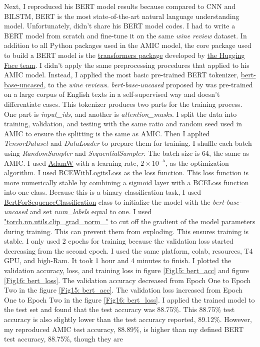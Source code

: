\documentclass[aoas]{imsart}
\numberwithin{equation}{section}
\theoremstyle{plain}
\theoremstyle{remark}
\begin{document}
Next, I reproduced his BERT model results because compared to CNN and BILSTM, BERT is the most state-of-the-art natural language understanding model. Unfortunately, \cite{chenyu} didn't share his BERT model codes. I had to write a BERT model from scratch and fine-tune it on the same \textit{wine review} dataset. In addition to all Python packages used in the AMIC model, the core package used to build a BERT model is the \href{https://huggingface.co/docs/transformers/index}{transformers package} developed by \href{https://huggingface.co/support}{the Hugging Face team}. I didn't apply the same preprocessing procedures that \cite{chenyu} applied to his AMIC model. Instead, I applied the most basic pre-trained BERT tokenizer, \href{https://huggingface.co/bert-base-uncased}{bert-base-uncased}, to the \textit{wine reviews}. \textit{bert-base-uncased} proposed by \cite{DBLP:journals/corr/abs-1810-04805} was pre-trained on a large corpus of English texts in a self-supervised way and doesn't differentiate cases. This tokenizer produces two parts for the training process. One part is \textit{input\_ids}, and another is \textit{attention\_masks}. I split the data into training, validation, and testing with the same ratio and random seed used in AMIC to ensure the splitting is the same as AMIC. Then I applied \textit{TensorDataset} and \textit{DataLoader} to prepare them for training. I shuffle each batch using \textit{RandomSampler} and \textit{SequentialSampler}. The batch size is 64, the same as AMIC. I used \href{https://pytorch.org/docs/stable/generated/torch.optim.AdamW.html}{AdamW} with a learning rate, $2\times10^{-5}$, as the optimization algorithm. I used \href{https://pytorch.org/docs/stable/generated/torch.nn.BCEWithLogitsLoss.html}{BCEWithLogitsLoss} as the loss function. This loss function is more numerically stable by combining a sigmoid layer with a BCELoss function into one class. Because this is a binary classification task, I used \href{https://huggingface.co/transformers/v3.0.2/model_doc/bert.html#bertforsequenceclassification}{BertForSequenceClassification} class to initialize the model with the \textit{bert-base-uncased} and set \textit{num\_labels} equal to one. I used \href{https://pytorch.org/docs/stable/generated/torch.nn.utils.clip_grad_norm_.html}{"torch.nn.utils.clip\_grad\_norm\_"} to cut off the gradient of the model parameters during training. This can prevent them from exploding. This ensures training is stable. I only used 2 epochs for training because the validation loss started decreasing from the second epoch. I used the same platform, colab, resources, T4 GPU, and high-Ram. It took 1 hour and 4 minutes to finish. I plotted the validation accuracy, loss, and training loss in figure \ref{Fig15: bert_acc} and figure \ref{Fig16: bert_loss}. The validation accuracy decreased from Epoch One to Epoch Two in the figure \ref{Fig15: bert_acc}. The validation loss increased from Epoch One to Epoch Two in the figure \ref{Fig16: bert_loss}. I applied the trained model to the test set and found that the test accuracy was 88.75\%. This 88.75\% test accuracy is also slightly lower than the test accuracy \cite{chenyu} reported, 89.12\%. However, my reproduced AMIC test accuracy, 88.89\%, is higher than my defined BERT test accuracy, 88.75\%, though they are 
\end{document}
